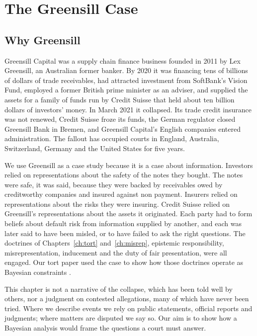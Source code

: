 \chapter{The Greensill Case}
\label{ch:greensill}

\section{Why Greensill}

Greensill Capital was a supply chain finance business founded in 2011 by Lex Greensill, an Australian former banker. By 2020 it was financing tens of billions of dollars of trade receivables, had attracted investment from SoftBank's Vision Fund, employed a former British prime minister as an adviser, and supplied the assets for a family of funds run by Credit Suisse that held about ten billion dollars of investors' money. In March 2021 it collapsed. Its trade credit insurance was not renewed, Credit Suisse froze its funds, the German regulator closed Greensill Bank in Bremen, and Greensill Capital's English companies entered administration. The fallout has occupied courts in England, Australia, Switzerland, Germany and the United States for five years.

We use Greensill as a case study because it is a case about information. Investors relied on representations about the safety of the notes they bought. The notes were safe, it was said, because they were backed by receivables owed by creditworthy companies and insured against non payment. Insurers relied on representations about the risks they were insuring. Credit Suisse relied on Greensill's representations about the assets it originated. Each party had to form beliefs about default risk from information supplied by another, and each was later said to have been misled, or to have failed to ask the right questions. The doctrines of Chapters~\ref{ch:tort} and~\ref{ch:misrep}, epistemic responsibility, misrepresentation, inducement and the duty of fair presentation, were all engaged. Our tort paper used the case to show how those doctrines operate as Bayesian constraints \citep{polson_sokolov_tort}.

This chapter is not a narrative of the collapse, which has been told well by others, nor a judgment on contested allegations, many of which have never been tried. Where we describe events we rely on public statements, official reports and judgments; where matters are disputed we say so. Our aim is to show how a Bayesian analysis would frame the questions a court must answer.


